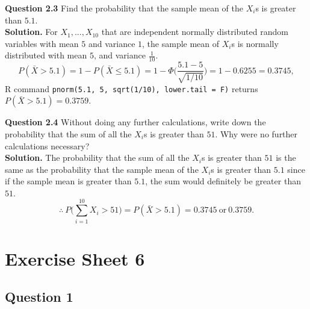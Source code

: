 \documentclass[
]{book}
\begin{document}
\textbf{Question 2.3} Find the probability that the sample mean of the \(X_i\)s is greater than \(5.1\).\\
\textbf{Solution.} For \(X_1, ..., X_{10}\) that are independent normally distributed random variables with mean \(5\) and variance \(1\), the sample mean of \(X_i\)s is normally distributed with mean \(5\), and variance \(\frac{1}{10}\).
\[P(\bar{X} > 5.1) = 1 - P(\bar{X} \leq 5.1) = 1 - \Phi\bigg(\frac{5.1-5}{\sqrt{1/10}}\bigg) = 1 - 0.6255 = 0.3745,\]
R command \texttt{pnorm(5.1,\ 5,\ sqrt(1/10),\ lower.tail\ =\ F)} returns \(P(\bar{X} > 5.1) = 0.3759\).

\textbf{Question 2.4} Without doing any further calculations, write down the probability that the sum of all the \(X_i\)s is greater than \(51\). Why were no further calculations necessary?\\
\textbf{Solution.} The probability that the sum of all the \(X_i\)s is greater than \(51\) is the same as the probability that the sample mean of the \(X_i\)s is greater than \(5.1\) since if the sample mean is greater than \(5.1\), the sum would definitely be greater than \(51\).
\[\therefore \ P \bigg(\sum_{i=1}^{10} X_i > 51 \bigg) = P(\bar{X} > 5.1) = 0.3745 \ \text{or} \ 0.3759.\]

\chapter{Exercise Sheet 6}\label{exercise-sheet-6}

\section{Question 1}\label{question-1-5}
\end{document}
